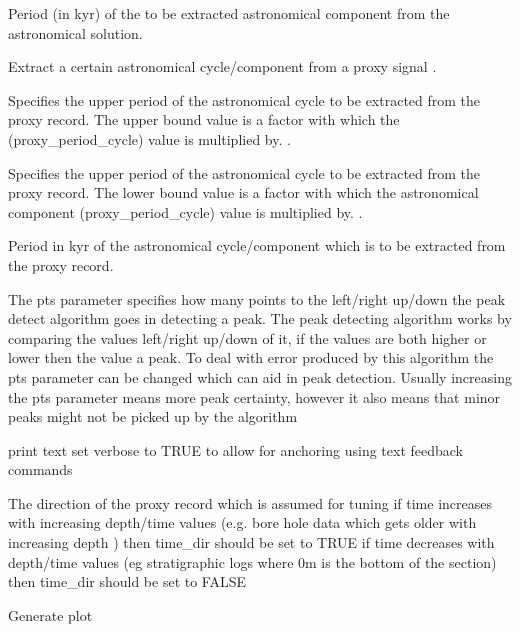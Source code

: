 \documentclass[a4paper]{book}
\begin{document}
\begin{Arguments}
\begin{ldescription}
\item[\code{astro\_period\_cycle}] Period (in kyr) of the to be extracted astronomical component
from the astronomical solution.

\item[\code{extract\_proxy\_signal}] Extract a certain astronomical cycle/component from a
proxy signal  .

\item[\code{proxy\_period\_up}] Specifies the upper period of the astronomical cycle to be extracted
from the proxy record. The upper bound value is a factor with which the
(proxy\_period\_cycle) value is multiplied by. .

\item[\code{proxy\_period\_down}] Specifies the upper period of the astronomical cycle to be
extracted from the proxy record. The lower bound value is a factor with
which the astronomical component (proxy\_period\_cycle) value is multiplied by. .

\item[\code{proxy\_period\_cycle}] Period in kyr of the astronomical cycle/component which is to be extracted
from the proxy record.

\item[\code{pts}] The pts parameter specifies how many points to the left/right up/down the peak detect algorithm goes in detecting
a peak. The peak detecting algorithm works by comparing the values left/right up/down of it, if the values are both higher or lower
then the value a peak. To deal with error produced by this algorithm the pts parameter can be changed which can
aid in peak detection. Usually increasing the pts parameter means more peak certainty, however it also means that minor peaks might not be
picked up by the algorithm 

\item[\code{verbose}] print text  set verbose to TRUE to allow for anchoring using text feedback commands

\item[\code{time\_dir}] The direction of the proxy record which is assumed for tuning if time increases with increasing depth/time values
(e.g. bore hole data which gets older with increasing depth ) then time\_dir should be set to TRUE
if time decreases with depth/time values (eg stratigraphic logs where 0m is the bottom of the section)
then time\_dir should be set to FALSE 

\item[\code{genplot}] Generate plot 
\end{ldescription}
\end{Arguments}
\end{document}

